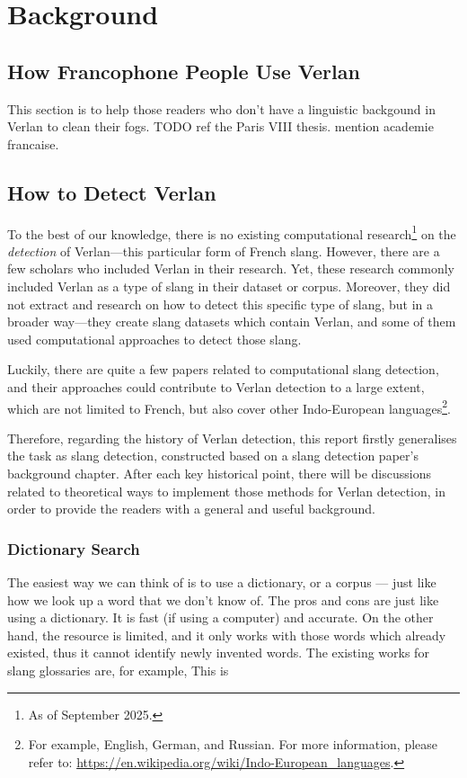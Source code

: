 \documentclass[12pt]{article}
\begin{document}
\section{Background}
\subsection{How Francophone People Use Verlan}
This section is to help those readers who don't have a linguistic backgound in Verlan to clean their fogs.
TODO 
ref the Paris VIII thesis.
mention academie francaise.


\subsection{How to Detect Verlan}

To the best of our knowledge, there is no existing computational research\footnote{As of September 2025.} on the \textit{detection} of Verlan\;---\;this particular form of French slang. However, there are a few scholars who included Verlan in their research\cite{zurbuchen2024, podhorna2020rapcor, mekki2021tremolo, panckhurst202088milsms}. Yet, these research commonly included Verlan as a type of slang in their dataset or corpus. Moreover, they did not extract and research on how to detect this specific type of slang, but in a broader way\;---\;they create slang datasets which contain Verlan, and some of them used computational approaches to detect those slang. 

Luckily, there are quite a few papers related to computational slang detection, and their approaches could contribute to Verlan detection to a large extent\cite{pei2019slang, sun2024informal, slangornot2024, wu2018slangsd}, which are not limited to French, but also cover other Indo-European languages\footnote{For example, English, German, and Russian. For more information, please refer to: \url{https://en.wikipedia.org/wiki/Indo-European_languages}.}.

Therefore, regarding the history of Verlan detection, this report firstly generalises the task as slang detection, constructed based on a slang detection paper's background chapter\cite{pei2019slang}. After each key historical point, there will be discussions related to theoretical ways to implement those methods for Verlan detection, in order to provide the readers with a general and useful background.


\subsubsection{Dictionary Search}
The easiest way we can think of is to use a dictionary, or a corpus --- just like how we look up a word that we don't know of. The pros and cons are just like using a dictionary. It is fast (if using a computer) and accurate. On the other hand, the resource is limited, and it only works with those words which already existed, thus it cannot identify newly invented words. The existing works for slang glossaries are, for example, This is
\end{document}
